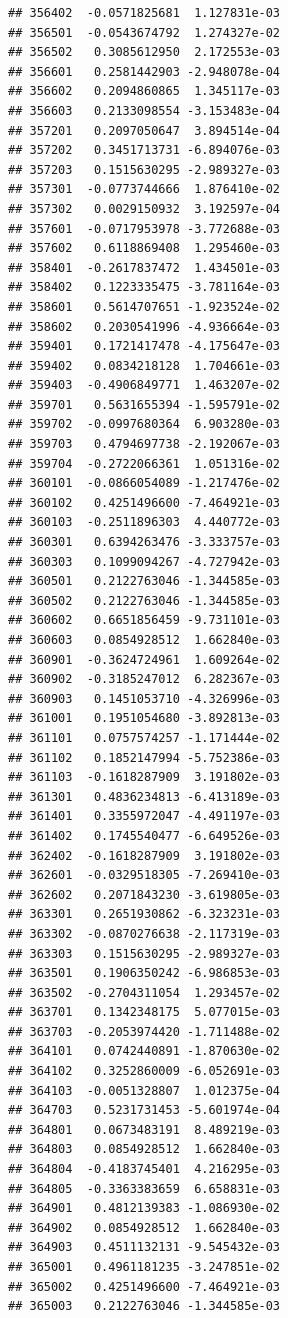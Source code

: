 \documentclass[ignorenonframetext,]{beamer}
\begin{document}
\begin{frame}[fragile]
\begin{verbatim}
## 356402  -0.0571825681  1.127831e-03
## 356501  -0.0543674792  1.274327e-02
## 356502   0.3085612950  2.172553e-03
## 356601   0.2581442903 -2.948078e-04
## 356602   0.2094860865  1.345117e-03
## 356603   0.2133098554 -3.153483e-04
## 357201   0.2097050647  3.894514e-04
## 357202   0.3451713731 -6.894076e-03
## 357203   0.1515630295 -2.989327e-03
## 357301  -0.0773744666  1.876410e-02
## 357302   0.0029150932  3.192597e-04
## 357601  -0.0717953978 -3.772688e-03
## 357602   0.6118869408  1.295460e-03
## 358401  -0.2617837472  1.434501e-03
## 358402   0.1223335475 -3.781164e-03
## 358601   0.5614707651 -1.923524e-02
## 358602   0.2030541996 -4.936664e-03
## 359401   0.1721417478 -4.175647e-03
## 359402   0.0834218128  1.704661e-03
## 359403  -0.4906849771  1.463207e-02
## 359701   0.5631655394 -1.595791e-02
## 359702  -0.0997680364  6.903280e-03
## 359703   0.4794697738 -2.192067e-03
## 359704  -0.2722066361  1.051316e-02
## 360101  -0.0866054089 -1.217476e-02
## 360102   0.4251496600 -7.464921e-03
## 360103  -0.2511896303  4.440772e-03
## 360301   0.6394263476 -3.333757e-03
## 360303   0.1099094267 -4.727942e-03
## 360501   0.2122763046 -1.344585e-03
## 360502   0.2122763046 -1.344585e-03
## 360602   0.6651856459 -9.731101e-03
## 360603   0.0854928512  1.662840e-03
## 360901  -0.3624724961  1.609264e-02
## 360902  -0.3185247012  6.282367e-03
## 360903   0.1451053710 -4.326996e-03
## 361001   0.1951054680 -3.892813e-03
## 361101   0.0757574257 -1.171444e-02
## 361102   0.1852147994 -5.752386e-03
## 361103  -0.1618287909  3.191802e-03
## 361301   0.4836234813 -6.413189e-03
## 361401   0.3355972047 -4.491197e-03
## 361402   0.1745540477 -6.649526e-03
## 362402  -0.1618287909  3.191802e-03
## 362601  -0.0329518305 -7.269410e-03
## 362602   0.2071843230 -3.619805e-03
## 363301   0.2651930862 -6.323231e-03
## 363302  -0.0870276638 -2.117319e-03
## 363303   0.1515630295 -2.989327e-03
## 363501   0.1906350242 -6.986853e-03
## 363502  -0.2704311054  1.293457e-02
## 363701   0.1342348175  5.077015e-03
## 363703  -0.2053974420 -1.711488e-02
## 364101   0.0742440891 -1.870630e-02
## 364102   0.3252860009 -6.052691e-03
## 364103  -0.0051328807  1.012375e-04
## 364703   0.5231731453 -5.601974e-04
## 364801   0.0673483191  8.489219e-03
## 364803   0.0854928512  1.662840e-03
## 364804  -0.4183745401  4.216295e-03
## 364805  -0.3363383659  6.658831e-03
## 364901   0.4812139383 -1.086930e-02
## 364902   0.0854928512  1.662840e-03
## 364903   0.4511132131 -9.545432e-03
## 365001   0.4961181235 -3.247851e-02
## 365002   0.4251496600 -7.464921e-03
## 365003   0.2122763046 -1.344585e-03

\end{verbatim}
\end{frame}
\end{document}
